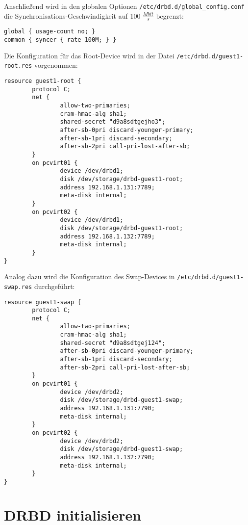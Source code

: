 Anschließend wird in den globalen Optionen \verb|/etc/drbd.d/global_config.conf| die Synchronisations-Geschwindigkeit auf 100 $\frac{Mbit}{s}$ begrenzt:

\setupVerbatimOut
\begin{verbatim}
global { usage-count no; }
common { syncer { rate 100M; } }
\end{verbatim}

Die Konfiguration für das Root-Device wird in der Datei \verb|/etc/drbd.d/guest1-root.res| vorgenommen:
\setupVerbatimOut
\begin{verbatim}
resource guest1-root {
        protocol C;
        net {
                allow-two-primaries;
                cram-hmac-alg sha1;
                shared-secret "d9a8sdtgejho3";
                after-sb-0pri discard-younger-primary;
                after-sb-1pri discard-secondary;
                after-sb-2pri call-pri-lost-after-sb;
        }
        on pcvirt01 {
                device /dev/drbd1;
                disk /dev/storage/drbd-guest1-root;
                address 192.168.1.131:7789;
                meta-disk internal;
        }
        on pcvirt02 {
                device /dev/drbd1;
                disk /dev/storage/drbd-guest1-root;
                address 192.168.1.132:7789;
                meta-disk internal;
        }
}
\end{verbatim}

Analog dazu wird die Konfiguration des Swap-Devices in \verb|/etc/drbd.d/guest1-swap.res| durchgeführt:
\setupVerbatimOut
\begin{verbatim}
resource guest1-swap {
        protocol C;
        net {
                allow-two-primaries;
                cram-hmac-alg sha1;
                shared-secret "d9a8sdtgej124";
                after-sb-0pri discard-younger-primary;
                after-sb-1pri discard-secondary;
                after-sb-2pri call-pri-lost-after-sb;
        }
        on pcvirt01 {
                device /dev/drbd2;
                disk /dev/storage/drbd-guest1-swap;
                address 192.168.1.131:7790;
                meta-disk internal;
        }
        on pcvirt02 {
                device /dev/drbd2;
                disk /dev/storage/drbd-guest1-swap;
                address 192.168.1.132:7790;
                meta-disk internal;
        }
}
\end{verbatim}


\section{DRBD initialisieren}

